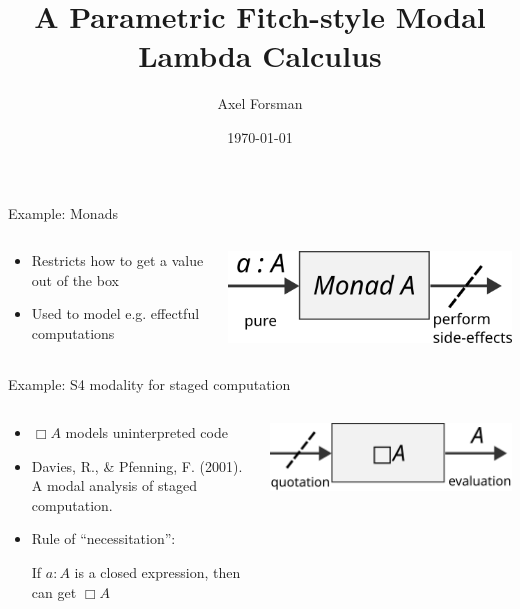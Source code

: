 \documentclass{beamer}
\title{A Parametric Fitch-style Modal Lambda Calculus}
\author{Axel Forsman}
\institute[CTH]{Chalmers University of Technology}
\date{\today}
\begin{document}
\frame{\titlepage}

\begin{frame}{Example: Monads}
  \begin{columns}
    \begin{column}{.49\textwidth}
      \begin{itemize}
      \item Restricts how to get a value out of the box
      \item Used to model e.g. effectful computations
      \end{itemize}
    \end{column}

    \begin{column}{.49\textwidth}
        \includegraphics[width=\textwidth]{monad}
    \end{column}
  \end{columns}
\end{frame}

\begin{frame}{Example: S4 modality for staged computation}
  \begin{columns}
    \begin{column}{.49\textwidth}
      \begin{itemize}
      \item $\Box A$ models uninterpreted code
      \item Davies, R., \& Pfenning, F. (2001). A modal analysis of staged computation.
      \item Rule of ``necessitation'':

        If $a : A$ is a closed expression, then can get $\Box A$
      \end{itemize}
    \end{column}

    \begin{column}{.49\textwidth}
        \includegraphics[width=\textwidth]{s4-staged-computation}
    \end{column}
  \end{columns}
\end{frame}
\end{document}
